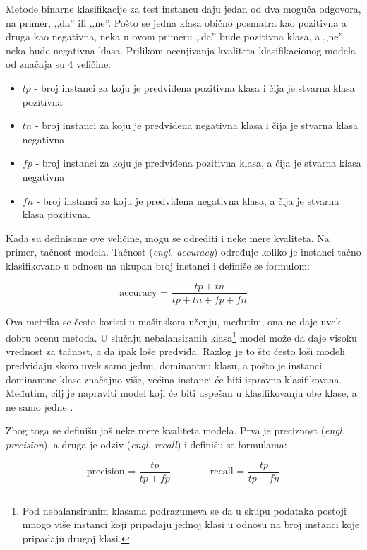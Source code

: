 Metode binarne klasifikacije za test instancu daju jedan od dva moguća odgovora, na primer, ‚‚da'' ili ‚‚ne''. Pošto se jedna klasa obično posmatra kao pozitivna a druga kao negativna, neka u ovom primeru ‚‚da'' bude pozitivna klasa, a ‚‚ne'' neka bude negativna klasa. Prilikom ocenjivanja kvaliteta klasifikacionog modela od značaja su 4 veličine:

\begin{itemize}
	\item $tp$ - broj instanci za koju je predviđena pozitivna klasa i čija je stvarna klasa pozitivna
	
	\item $tn$ - broj instanci za koju je predviđena negativna klasa i čija je stvarna klasa negativna
	
	\item $fp$  - broj instanci za koju je predviđena pozitivna klasa, a čija je stvarna klasa negativna
	
	\item $fn$ - broj instanci za koju je predviđena negativna klasa, a čija je stvarna klasa pozitivna.
	
\end{itemize}


Kada su definisane ove veličine, mogu se odrediti i neke mere kvaliteta. Na primer, tačnost modela. Tačnost (\textit{engl. accuracy}) određuje koliko je instanci tačno klasifikovano u odnosu na ukupan broj instanci i definiše se formulom:

$$\text{accuracy = } \dfrac{tp + tn}{tp +tn +fp +fn}$$ 

Ova metrika se često koristi u mašinskom učenju, međutim, ona ne daje uvek dobru ocenu metoda. U slučaju nebalansiranih klasa\footnote{Pod nebalansiranim klasama podrazumeva se da u skupu podataka postoji mnogo više instanci koji pripadaju jednoj klasi u odnosu na broj instanci koje pripadaju drugoj klasi.} model može da daje visoku vrednost za tačnost, a da ipak loše predviđa. Razlog je to što često loši modeli predviđaju skoro uvek samo jednu, dominantnu klasu, a pošto je instanci dominantne klase značajno više, većina instanci će biti ispravno klasifikovana. Međutim, cilj je napraviti model koji će biti uspešan u klasifikovanju obe klase, a ne samo jedne \cite{f1}.

Zbog toga se definišu još neke mere kvaliteta modela. Prva je preciznost (\textit{engl. precision}), a druga je odziv (\textit{engl. recall}) i definišu se formulama:

$$ \text{precision = } \dfrac{tp}{tp + fp}  \qquad  \qquad \text{recall = } \dfrac{tp}{tp + fn}$$

